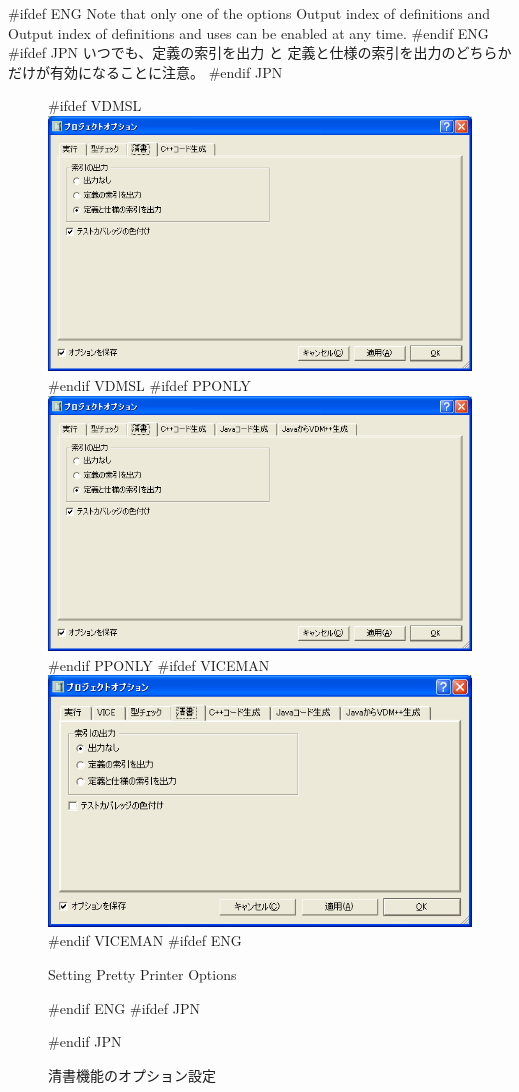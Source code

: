\documentclass[\pformat,12pt]{article}
\newcommand{\guicmd}[1]{{\sf #1}}
\newcommand{\guicmd}[1]{{\gt #1}}
\begin{document}
#ifdef ENG
Note that only one of the options {\sf Output index of definitions}
  and {\sf Output index of definitions and uses} can be enabled at any
  time.
#endif ENG
#ifdef JPN
いつでも、\guicmd{定義の索引を出力} と \guicmd{定義と仕様の索引を出力}のどちらか
だけが有効になることに注意。
#endif JPN


\begin{figure}[tbh]
\begin{center}
#ifdef VDMSL
\includegraphics[width=12cm]{ppOptions-sl.png}
#endif VDMSL
#ifdef PPONLY
\includegraphics[width=12cm]{ppOptions-pp.png}
#endif PPONLY
#ifdef VICEMAN
\includegraphics[width=12cm]{ppOptions-vice.png}
#endif VICEMAN
#ifdef ENG
\caption{Setting Pretty Printer Options}
#endif ENG
#ifdef JPN
\caption{清書機能のオプション設定}
#endif JPN
\label{fig:optpp}
\end{center}
\end{figure}
\end{document}
